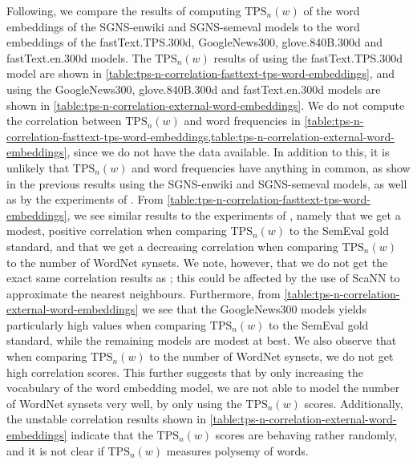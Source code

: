 
Following, we compare the results of computing $\text{TPS}_n(w)$ of the word embeddings of the SGNS-enwiki and SGNS-semeval models to the word embeddings of the fastText.TPS.300d, GoogleNews300, glove.840B.300d and fastText.en.300d models. The $\text{TPS}_n(w)$ results of using the fastText.TPS.300d model are shown in \cref{table:tps-n-correlation-fasttext-tps-word-embeddings}, and using the GoogleNews300, glove.840B.300d and fastText.en.300d models are shown in \cref{table:tps-n-correlation-external-word-embeddings}. We do not compute the correlation between $\text{TPS}_n(w)$ and word frequencies in \cref{table:tps-n-correlation-fasttext-tps-word-embeddings,table:tps-n-correlation-external-word-embeddings}, since we do not have the data available. In addition to this, it is unlikely that $\text{TPS}_n(w)$ and word frequencies have anything in common, as show in the previous results using the SGNS-enwiki and SGNS-semeval models, as well as by the experiments of \cite{jakubowski2020topology}. From \cref{table:tps-n-correlation-fasttext-tps-word-embeddings}, we see similar results to the experiments of \cite{jakubowski2020topology}, namely that we get a modest, positive correlation when comparing $\text{TPS}_n(w)$ to the SemEval gold standard, and that we get a decreasing correlation when comparing $\text{TPS}_n(w)$ to the number of WordNet synsets. We note, however, that we do not get the exact same correlation results as \cite{jakubowski2020topology}; this could be affected by the use of ScaNN to approximate the nearest neighbours. Furthermore, from \cref{table:tps-n-correlation-external-word-embeddings} we see that the GoogleNews300 models yields particularly high values when comparing $\text{TPS}_n(w)$ to the SemEval gold standard, while the remaining models are modest at best. We also observe that when comparing $\text{TPS}_n(w)$ to the number of WordNet synsets, we do not get high correlation scores. This further suggests that by only increasing the vocabulary of the word embedding model, we are not able to model the number of WordNet synsets very well, by only using the $\text{TPS}_n(w)$ scores. Additionally, the unstable correlation results shown in \cref{table:tps-n-correlation-external-word-embeddings} indicate that the $\text{TPS}_n(w)$ scores are behaving rather randomly, and it is not clear if $\text{TPS}_n(w)$ measures polysemy of words.
